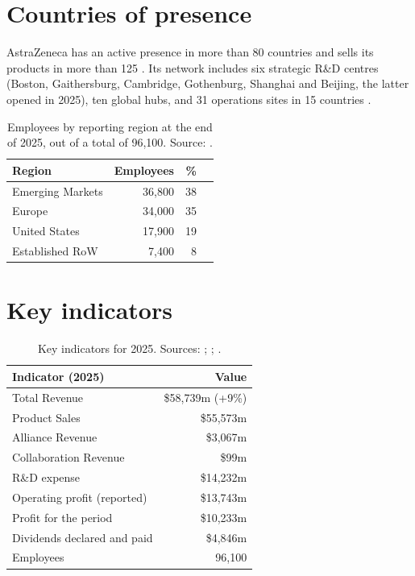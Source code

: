 \section{Countries of presence}

AstraZeneca has an active presence in more than 80 countries and sells its products in more than 125 \cite[p.~32]{AR}. Its network includes six strategic R\&D centres (Boston, Gaithersburg, Cambridge, Gothenburg, Shanghai and Beijing, the latter opened in 2025), ten global hubs, and 31 operations sites in 15 countries \cite[p.~27]{AR}.


\begin{table}[H]\centering
\caption{Employees by reporting region at the end of 2025, out of a total of 96,100. Source: \cite[p.~27]{AR}.}
\label{tab:empregados}
\begin{tabular}{@{}lrrB@{}}
\toprule
\textbf{Region} & \textbf{Employees} & \textbf{\%} & \\
\midrule
Emerging Markets & 36,800 & 38 &  \\
Europe           & 34,000 & 35 &  \\
United States    & 17,900 & 19 &  \\
Established RoW  &  7,400 &  8 &  \\
\bottomrule
\end{tabular}
\end{table}
\section{Key indicators}

\begin{table}[H]\centering
\caption{Key indicators for 2025. Sources: \cite[p.~1]{AR}; \cite[p.~125]{AR}; \cite[p.~27]{AR}.}
\label{tab:indicadores}
\begin{tabular}{@{}lr@{}}
\toprule
\textbf{Indicator (2025)} & \textbf{Value} \\
\midrule
Total Revenue                   & \$58,739m (+9\%) \\
\quad Product Sales             & \$55,573m \\
\quad Alliance Revenue          & \$3,067m \\
\quad Collaboration Revenue     & \$99m \\
\addlinespace
R\&D expense                    & \$14,232m \\
Operating profit (reported)     & \$13,743m \\
Profit for the period           & \$10,233m \\
Dividends declared and paid     & \$4,846m \\
Employees                       & 96,100 \\
\bottomrule
\end{tabular}
\end{table}

